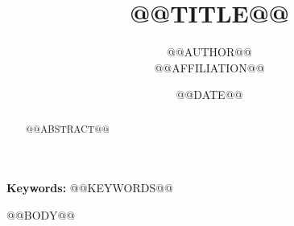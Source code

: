 \documentclass[11pt,a4paper]{article}
\title{@@TITLE@@}
\author{@@AUTHOR@@\\@@AFFILIATION@@}
\date{@@DATE@@}
\begin{document}
\maketitle
\begin{abstract}
@@ABSTRACT@@
\end{abstract}
\noindent\textbf{Keywords:} @@KEYWORDS@@

@@BODY@@



\end{document}
